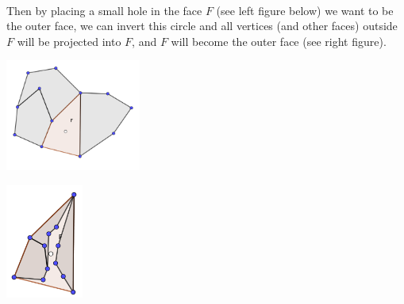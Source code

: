 \documentclass{article}
\begin{document}
\\
Then by placing a small hole in the face $F$ (see left figure below) we want to be the outer face, we can invert this circle and all vertices (and other faces) outside $F$ will be projected into $F$, and $F$ will become the outer face (see right figure).
\\
\begin{paracol}{2}

\begin{leftcolumn}
\centerline{\includegraphics[width=1.75in]{Images/Before.png}}
\end{leftcolumn}
\begin{rightcolumn}
\centerline{\includegraphics[width=1in]{Images/After.png}}
\end{rightcolumn}
\end{paracol}
\end{document}
